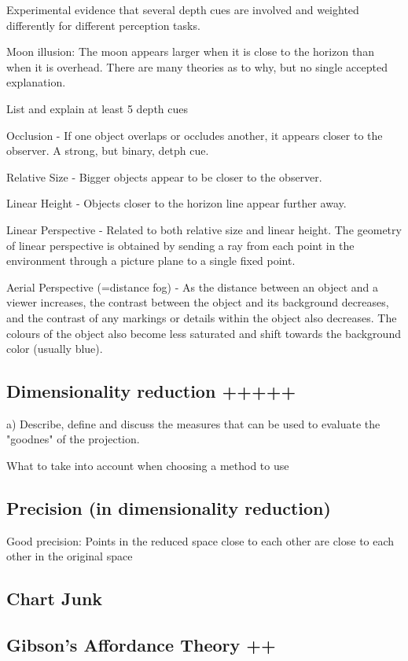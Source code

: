 \documentclass[a4paper]{article}
\begin{document}
Experimental evidence that several depth cues are involved and weighted differently for different perception tasks.

Moon illusion: The moon appears larger when it is close to the horizon than when it is overhead. There are many theories as to why, but no single accepted explanation.


List and explain at least 5 depth cues

Occlusion - If one object overlaps or occludes another, it appears closer to the observer. A strong, but binary, detph cue.

Relative Size - Bigger objects appear to be closer to the observer.

Linear Height - Objects closer to the horizon line appear further away.

Linear Perspective - Related to both relative size and linear height. The geometry of linear perspective is obtained by sending a ray from each point in the environment through a picture plane to a single fixed point.

Aerial Perspective (=distance fog) - As the distance between an object and a viewer increases, the contrast between the object and its background decreases, and the contrast of any markings or details within the object also decreases. The colours of the object also become less saturated and shift towards the background color (usually blue).

\subsection{Dimensionality reduction +++++}

a) Describe, define and discuss the measures that can be used to evaluate the "goodnes" of the projection.

What to take into account when choosing a method to use

\subsection{Precision (in dimensionality reduction)}

Good precision: Points in the reduced space close to each other are close to each other in the original space

\subsection{Chart Junk}

\subsection{Gibson's Affordance Theory ++}
\end{document}
